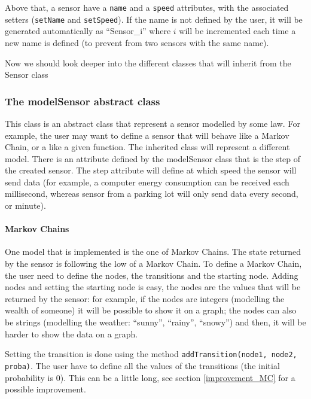 Above that, a sensor have a \verb!name! and a \verb!speed! attributes, with the associated setters (\verb!setName! and \verb!setSpeed!). If the name is not defined by the user, it will be generated automatically as ``Sensor\_i'' where $i$ will be incremented each time a new name is defined (to prevent from two sensors with the same name).

Now we should look deeper into the different classes that will inherit from the Sensor class


\subsubsection{The modelSensor abstract class}

This class is an abstract class that represent a sensor modelled by some law. For example, the user may want to define a sensor that will behave like a Markov Chain, or a like a given function. The inherited class will represent a different model. There is an attribute defined by the modelSensor class that is the step of the created sensor. The step attribute will define at which speed the sensor will send data (for example, a computer energy consumption can be received each millisecond, whereas sensor from a parking lot will only send data every second, or minute).

\paragraph{Markov Chains}

One model that is implemented is the one of Markov Chains. The state returned by the sensor is following the low of a Markov Chain. To define a Markov Chain, the user need to define the nodes, the transitions and the starting node. Adding nodes and setting the starting node is easy, the nodes are the values that will be returned by the sensor: for example, if the nodes are integers (modelling the wealth of someone) it will be possible to show it on a graph; the nodes can also be strings (modelling the weather: ``sunny'', ``rainy'', ``snowy'') and then, it will be harder to show the data on a graph.

Setting the transition is done using the method \verb!addTransition(node1, node2, proba)!. The user have to define all the values of the transitions (the initial probability is 0). This can be a little long, see section \ref{improvement_MC} for a possible improvement.

